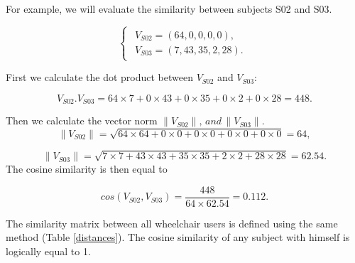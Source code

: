 For example, we will evaluate the similarity between subjects S02 and S03.

\[
\begin{cases}
\begin{array}{c}
V_{S02}=(64,0,0,0,0),\\
V_{S03}=(7,43,35,2,28).
\end{array}
\end{cases}
\]

First we calculate the dot product between $V_{S02}$ and $V_{S03}$:

\[
V_{S02}. V_{S03}=64\times7+0\times43+0\times35+0\times2+0\times28=448.
\]

Then we calculate the vector norm $\parallel V_{S02}\parallel,\,and\,\parallel V_{S03}\parallel$.
\[
\parallel V_{S02} \parallel =\sqrt{64\times64+0\times0+0\times0+0\times0+0\times0}=64,
\]

\[
\parallel V_{S03} \parallel =\sqrt{7\times7+43\times43+35\times35+2\times2+28\times28}=62.54.
\]
The cosine similarity is then equal to 

\[
cos(V_{S02},V_{S03})=\frac{448}{64\times62.54}=0.112.
\]

The similarity matrix between all wheelchair users is defined using the same method (Table \ref{distances}). The cosine similarity of any subject with himself is logically equal to 1.


